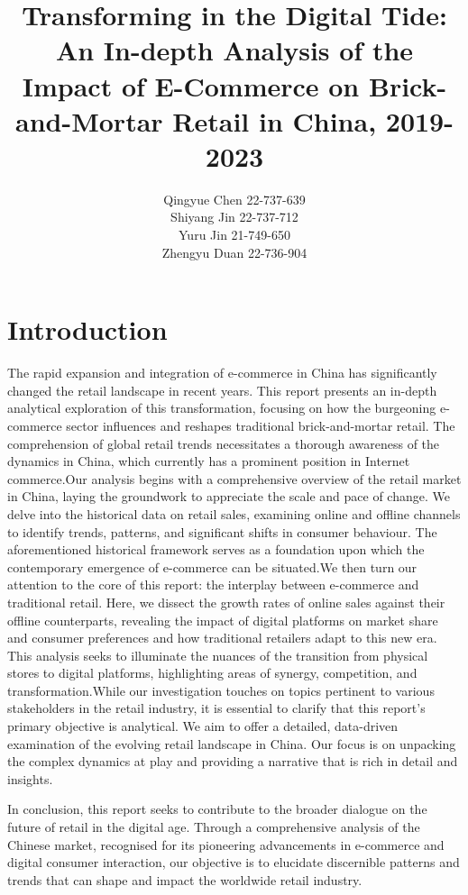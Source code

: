 \documentclass{article}
\title{Transforming in the Digital Tide: An In-depth Analysis of the Impact of E-Commerce on Brick-and-Mortar Retail in China, 2019-2023}
\author{Qingyue Chen 22-737-639\\Shiyang Jin 22-737-712\\
Yuru Jin 21-749-650\\Zhengyu Duan 22-736-904}
\begin{document}
\maketitle

\tableofcontents %
\newpage

\section{Introduction}
The rapid expansion and integration of e-commerce in China has significantly changed the retail landscape in recent years. This report presents an in-depth analytical exploration of this transformation, focusing on how the burgeoning e-commerce sector influences and reshapes traditional brick-and-mortar retail. The comprehension of global retail trends necessitates a thorough awareness of the dynamics in China, which currently has a prominent position in Internet commerce.Our analysis begins with a comprehensive overview of the retail market in China, laying the groundwork to appreciate the scale and pace of change. We delve into the historical data on retail sales, examining online and offline channels to identify trends, patterns, and significant shifts in consumer behaviour. The aforementioned historical framework serves as a foundation upon which the contemporary emergence of e-commerce can be situated.We then turn our attention to the core of this report: the interplay between e-commerce and traditional retail. Here, we dissect the growth rates of online sales against their offline counterparts, revealing the impact of digital platforms on market share and consumer preferences and how traditional retailers adapt to this new era. This analysis seeks to illuminate the nuances of the transition from physical stores to digital platforms, highlighting areas of synergy, competition, and transformation.While our investigation touches on topics pertinent to various stakeholders in the retail industry, it is essential to clarify that this report's primary objective is analytical. We aim to offer a detailed, data-driven examination of the evolving retail landscape in China. Our focus is on unpacking the complex dynamics at play and providing a narrative that is rich in detail and insights.

In conclusion, this report seeks to contribute to the broader dialogue on the future of retail in the digital age. Through a comprehensive analysis of the Chinese market, recognised for its pioneering advancements in e-commerce and digital consumer interaction, our objective is to elucidate discernible patterns and trends that can shape and impact the worldwide retail industry.
\end{document}
